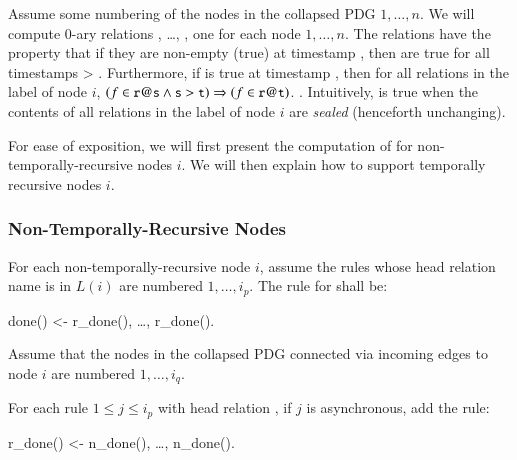 
Assume some numbering of the nodes in the collapsed PDG $1,\ldots,n$.  We will compute 0-ary relations , \ldots, , one for each node $1,\ldots,n$.  The relations  have the property that if they are non-empty (true) at timestamp , then are true for all timestamps  > .  Furthermore, if  is true at timestamp , then for all relations  in the label of node $i$, $(f \in \dedalus{r}@\dedalus{s} \land \dedalus{s} > \dedalus{t}) \Rightarrow (f \in \dedalus{r}@\dedalus{t})$. .  Intuitively,  is true when the contents of all relations in the label of node $i$ are {\em sealed} (henceforth unchanging).


For ease of exposition, we will first present the computation of  for non-temporally-recursive nodes $i$.  We will then explain how to support temporally recursive nodes $i$.

\subsubsection{Non-Temporally-Recursive Nodes}

For each non-temporally-recursive node $i$, assume the rules whose head relation name is in $L(i)$ are numbered $1, \ldots, i_p$.  The rule for  shall be:

\begin{Dedalus}
done() <- r_done(), \ldots, r_done().
\end{Dedalus}

Assume that the nodes in the collapsed PDG connected via incoming edges to node $i$ are numbered $1, \ldots, i_q$.

For each rule  $1 \leq j \leq i_p$ with head relation , if $j$ is asynchronous, add the rule:

\begin{Dedalus}
r_done() <- n_done(), \ldots, n_done().
\end{Dedalus}

